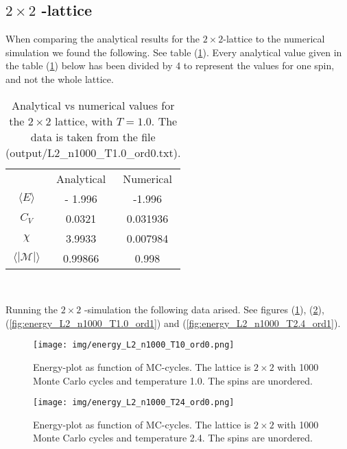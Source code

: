 \documentclass{article}
\begin{document}
\subsection{\texorpdfstring{ $2 \times 2$ }{text}-lattice}

When comparing the analytical results for the $2 \times 2$-lattice to the numerical simulation we found the following. See table (\ref{tab:analyticalvsnumerical}). Every analytical value given in the table (\ref{tab:analyticalvsnumerical}) below has been divided by 4 to represent the values for one spin, and not the whole lattice.

\begin{table}[h]
    \centering
    \caption{ Analytical vs numerical values for the $2 \times 2$ lattice, with $T = 1.0$. The data is taken from the file (output/L2\_n1000\_T1.0\_ord0.txt). }
    \vspace{1mm}
    \label{tab:analyticalvsnumerical}
    \begin{tabular}{ c | c c | }
        \multicolumn{1}{c}{}
         & \multicolumn{1}{c}{Analytical}
         & \multicolumn{1}{c}{Numerical} \\
         \cline{2-3}
        $\langle E \rangle $ & - 1.996 & -1.996 \\
        $C_V$ & 0.0321 & 0.031936 \\
        $\chi$ & 3.9933 & 0.007984 \\
        $\langle | \mathcal{M} | \rangle $ & 0.99866 & 0.998 \\
        \cline{2-3}
    \end{tabular} \\
\end{table}

Running the $2 \times 2$ -simulation the following data arised. See figures (\ref{fig:energy_L2_n1000_T1.0_ord0}), (\ref{fig:energy_L2_n1000_T2.4_ord0}), (\ref{fig:energy_L2_n1000_T1.0_ord1}) and (\ref{fig:energy_L2_n1000_T2.4_ord1}).

  \begin{figure}[ht]
      \centering
      \texttt{[image: img/energy\_L2\_n1000\_T10\_ord0.png]}
      \caption{Energy-plot as function of MC-cycles. The lattice is $2 \times 2$ with 1000 Monte Carlo cycles and temperature 1.0. The spins are unordered. }
      \label{fig:energy_L2_n1000_T1.0_ord0}
    \end{figure}

  \begin{figure}[ht]
      \centering
      \texttt{[image: img/energy\_L2\_n1000\_T24\_ord0.png]}
      \caption{Energy-plot as function of MC-cycles. The lattice is $2 \times 2$ with 1000 Monte Carlo cycles and temperature 2.4. The spins are unordered. }
      \label{fig:energy_L2_n1000_T2.4_ord0}
    \end{figure}
\end{document}
